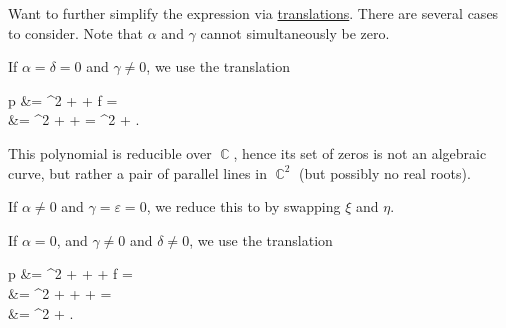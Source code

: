 \begin{algorithm}
  Want to further simplify the expression via \hyperref[def:rigid_motion/translation]{translations}. There are several cases to consider. Note that \( \alpha \) and \( \gamma \) cannot simultaneously be zero.

  \begin{thmenum}
     If \( \alpha = \delta = 0 \) and \( \gamma \neq 0 \), we use the translation
    \begin{balign*}
      p\parens*{ \xi, \eta - \frac \varepsilon {2 \gamma} }
      &=
      \gamma \parens*{ \eta - \frac \varepsilon {2 \gamma} }^2 + \varepsilon \parens*{ \eta - \frac \varepsilon {2 \gamma} } + f
      = \\ &=
      \gamma \eta^2 + \parens[\big]{ 2 \gamma \cdot \frac {-\varepsilon} {2 \gamma} + \varepsilon } \eta + 
      =
      \gamma \eta^2 + .
    \end{balign*}

    This polynomial is reducible over \( \BbbC \), hence its set of zeros is not an algebraic curve, but rather a pair of parallel lines in \( \BbbC^2 \) (but possibly no real roots).

     If \( \alpha \neq 0 \) and \( \gamma = \varepsilon = 0 \), we reduce this to  by swapping \( \xi \) and \( \eta \).

     If \( \alpha = 0 \), and \( \gamma \neq 0 \) and \( \delta \neq 0 \), we use the translation
    \begin{balign*}
      p
      &=
      \gamma \parens*{ \eta - \frac \varepsilon {2 \gamma} }^2 + \delta {} + \varepsilon \parens*{ \eta - \frac \varepsilon {2 \gamma} } + f
      = \\ &=
      \gamma \eta^2 + \delta {} + \parens[\big]{ 2 \gamma \cdot \frac {-\varepsilon} {2 \gamma} + \varepsilon } \eta + 
      = \\ &=
      \gamma \eta^2 + \delta \xi.
    \end{balign*}


\end{thmenum}
\end{algorithm}
